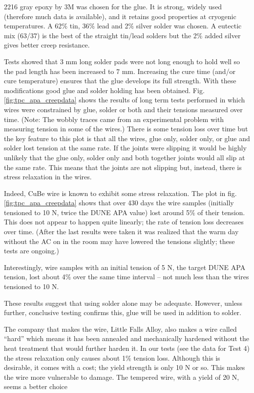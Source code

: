 2216 gray epoxy by 3M was chosen for the glue.  It is strong, widely used (therefore much data is available), and it retains good properties at cryogenic temperatures.  A 62$\%$ tin, 36$\%$ lead and 2$\%$ silver solder was chosen.  A eutectic mix (63/37) is the best of the straight tin/lead solders but the 2$\%$ added silver gives better creep resistance.

Tests showed that 3 mm long solder pads were not long enough to hold well so the pad length has been increased to 7 mm.  Increasing the cure time (and/or cure temperature) ensures that the glue develops its full strength.  With these modifications good glue and solder holding has been obtained.  Fig. \ref{fig:tpc_apa_creepdata} shows the results of long term tests performed in which wires were constrained by glue, solder or both and their tensions measured over time. (Note: The wobbly traces came from an experimental problem with measuring tension in some of the wires.)  There is some tension loss over time but the key feature to this plot is that all the wires, glue only, solder only, or glue and solder lost tension at the same rate.  If the joints were slipping it would be highly unlikely that the glue only, solder only and both together joints would all slip at the same rate.  This means that the joints are not slipping but, instead, there is stress relaxation in the wires.

Indeed, CuBe wire is known to exhibit some stress relaxation.  The plot in fig. \ref{fig:tpc_apa_creepdata} shows that over 430 days the wire samples (initially tensioned to 10 N, twice the DUNE APA value) lost around 5$\%$ of their tension.  This does not appear to happen quite linearly; the rate of tension loss decreases over time.  (After the last results were taken it was realized that the warm day without the AC on in the room may have lowered the tensions slightly; these tests are ongoing.)

Interestingly, wire samples with an initial tension of 5 N, the target DUNE APA tension, lost about 4$\%$ over the same time interval -- not much less than the wires tensioned to 10 N. 

These results suggest that using solder alone may be adequate.  However, unless further, conclusive testing confirms this, glue will be used in addition to solder. 

The company that makes the wire, Little Falls Alloy, also makes a wire called ``hard'' which means it has been annealed and mechanically hardened without the heat treatment that would further harden it.  In our tests (see the data for Test 4) the stress relaxation only causes about 1$\%$ tension loss.  Although this is desirable, it comes with a cost; the yield strength is only 10 N or so.  This makes the wire more vulnerable to damage.  The tempered wire, with a yield of 20 N, seems a better choice

